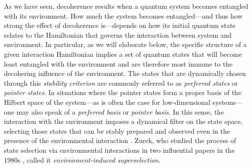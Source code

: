\documentclass[3p,sort&compress]{elsarticle}
\begin{document}
As we have seen, decoherence results when a quantum system becomes entangled with its environment. How much the system becomes entangled---and thus how strong the effect of decoherence is---depends on how its initial quantum state relates to the Hamiltonian that governs the interaction between system and environment. In particular, as we will elaborate below, the specific structure of a given interaction Hamiltonian implies a set of quantum states that will become least entangled with the environment and are therefore most immune to the decohering influence of the environment. The states that are dynamically chosen through this \emph{stability criterion} \cite{Zurek:1981:dd,Zurek:1982:tv} are commonly referred to as \emph{preferred states} or \emph{pointer states}. In situations where the pointer states form a proper basis of the Hilbert space of the system---as is often the case for low-dimensional systems---one may also speak of a \emph{preferred basis} or \emph{pointer basis}. In this sense, the interaction with the environment imposes a dynamical filter on the state space, selecting those states that can be stably prepared and observed even in the presence of the environmental interaction \cite{Zeh:1970:yt,Kubler:1973:ux,Zurek:1981:dd,Zurek:1982:tv,Walls:1985:lm}. Zurek, who studied the process of state selection via environmental interactions in two influential papers in the 1980s \cite{Zurek:1981:dd,Zurek:1982:tv}, called it \emph{environment-induced superselection}. 
\end{document}
